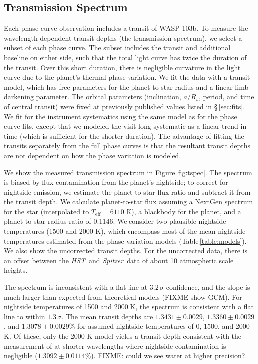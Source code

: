 \documentclass[twocolumn]{aastex61}
\newcommand{\project}[1]{\textsl{#1}}
\newcommand{\HST}{\project{HST}}
\newcommand{\Spitzer}{\project{Spitzer}}
\begin{document}
\subsection{Transmission Spectrum}
Each phase curve observation includes a transit of WASP-103b. To measure the wavelength-dependent transit depths (the transmission spectrum), we select a subset of each phase curve. The subset includes the transit and additional baseline on either side, such that the total light curve has twice the duration of the transit. Over this short duration, there is negligible curvature in the light curve due to the planet's thermal phase variation. We fit the data with a transit model, which has free parameters for the planet-to-star radius and a linear limb darkening parameter. The orbital parameters (inclination, $a/R_s$, period, and time of central transit) were fixed at previously published values listed in \S\,\ref{sec:fits}. We fit for the instrument systematics using the same model as for the phase curve fits, except that we modeled the visit-long systematic as a linear trend in time (which is sufficient for the shorter duration). The advantage of fitting the transits separately from the full phase curves is that the resultant transit depths are not dependent on how the phase variation is modeled. 

We show the measured transmission spectrum in Figure\,\ref{fig:tspec}.  The spectrum is biased by flux contamination from the planet's nightside; to correct for nightside emission, we estimate the planet-to-star flux ratio and subtract it from the transit depth. We calculate planet-to-star flux assuming a NextGen spectrum for the star (interpolated to $T_\mathrm{eff} = 6110$ K), a blackbody for the planet, and a planet-to-star radius ratio of 0.1146. We consider two plausible nightside temperatures (1500 and 2000 K), which encompass most of the mean nightside temperatures estimated from the phase variation models (Table\,\ref{table:models}). We also show the uncorrected transit depths. For the uncorrected data, there is an offset between the \HST\ and \Spitzer\ data of about 10 atmospheric scale heights. 

The spectrum is inconsistent with a flat line at $3.2\,\sigma$ confidence, and the slope is much larger than expected from theoretical models (FIXME show GCM). For nightside temperatures of 1500 and 2000 K, the spectrum is consistent with a flat line to within $1.3\,\sigma$.  The mean transit depths are $1.3431 \pm 0.0029$,  $1.3360 \pm 0.0029$, and $1.3078 \pm 0.0029\%$ for assumed nightside temperatures of 0, 1500, and 2000 K.  Of these, only the 2000 K model yields a transit depth consistent with the measurement of \cite{lendl17} at shorter wavelengths where nightside contamination is negligible ($1.3092 \pm 0.0114$\%). FIXME: could we see water at higher precision?
\end{document}
